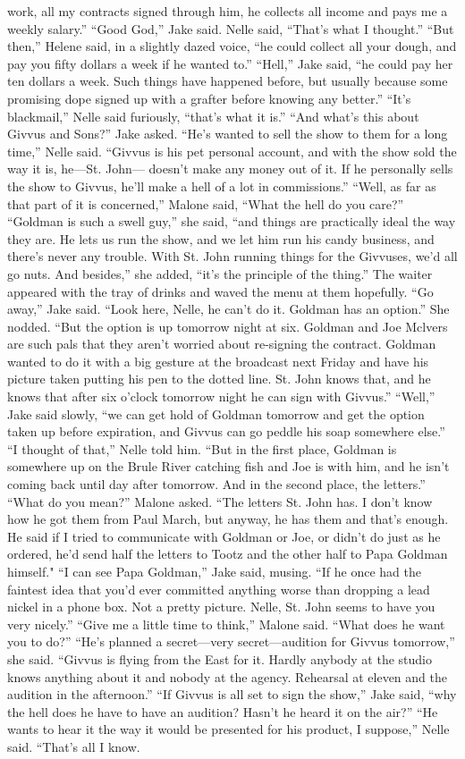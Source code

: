 \documentclass{novel}
\begin{document}
work, all my contracts signed through him, he collects all income and pays me a weekly salary.” “Good God,” Jake said. Nelle said, “That’s what I thought.” “But then,” Helene said, in a slightly dazed voice, “he could collect all your dough, and pay you fifty dollars a week if he wanted to.” “Hell,” Jake said, “he could pay her ten dollars a week. Such things have happened before, but usually because some promising dope signed up with a grafter before knowing any better.” “It’s blackmail,” Nelle said furiously, “that’s what it is.” “And what’s this about Givvus and Sons?” Jake asked. “He’s wanted to sell the show to them for a long time,” Nelle said. “Givvus is his pet personal account, and with the show sold the way it is, he—St. John— doesn’t make any money out of it. If he personally sells the show to Givvus, he’ll make a hell of a lot in commissions.” “Well, as far as that part of it is concerned,” Malone said, “What the hell do you care?” “Goldman is such a swell guy,” she said, “and things are practically ideal the way they are. He lets us run the show, and we let him run his candy business, and there’s never any trouble. With St. John running things for the Givvuses, we’d all go nuts. And besides,” she added, “it’s the principle of the thing.” The waiter appeared with the tray of drinks and waved the menu at them hopefully. “Go away,” Jake said. “Look here, Nelle, he can’t do it. Goldman has an option.” She nodded. “But the option is up tomorrow night at six. Goldman and Joe Mclvers are such pals that they aren’t worried about re-signing the contract. Goldman wanted to do it with a big gesture at the broadcast next Friday and have his picture taken putting his pen to the dotted line. St. John knows that, and he knows that after six o’clock tomorrow night he can sign with Givvus.” “Well,” Jake said slowly, “we can get hold of Goldman tomorrow and get the option taken up before expiration, and Givvus can go peddle his soap somewhere else.” “I thought of that,” Nelle told him. “But in the first place, Goldman is somewhere up on the Brule River catching fish and Joe is with him, and he isn’t coming back until day after tomorrow. And in the second place, the letters.” “What do you mean?” Malone asked. “The letters St. John has. I don’t know how he got them from Paul March, but anyway, he has them and that’s enough. He said if I tried to communicate with Goldman or Joe, or didn’t do just as he ordered, he’d send half the letters to Tootz and the other half to Papa Goldman himself." “I can see Papa Goldman,” Jake said, musing. “If he once had the faintest idea that you’d ever committed anything worse than dropping a lead nickel in a phone box. Not a pretty picture. Nelle, St. John seems to have you very nicely.” “Give me a little time to think,” Malone said. “What does he want you to do?” “He’s planned a secret—very secret—audition for Givvus tomorrow,” she said. “Givvus is flying from the East for it. Hardly anybody at the studio knows anything about it and nobody at the agency. Rehearsal at eleven and the audition in the afternoon.” “If Givvus is all set to sign the show,” Jake said, “why the hell does he have to have an audition? Hasn’t he heard it on the air?” “He wants to hear it the way it would be presented for his product, I suppose,” Nelle said. “That’s all I know. 
\end{document}
